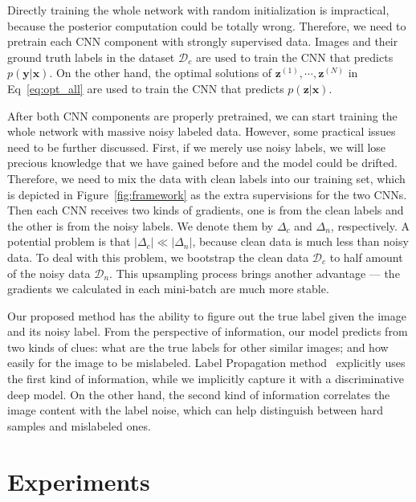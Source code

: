 \documentclass[10pt,twocolumn,letterpaper]{article}
\def\vec{\mathbf}
\begin{document}
Directly training the whole network with random initialization is impractical, because the posterior computation could be totally wrong. Therefore, we need to pretrain each CNN component with strongly supervised data. Images and their ground truth labels in the dataset $\mathcal{D}_c$ are used to train the CNN that predicts $p(\vec{y}|\vec{x})$. On the other hand, the optimal solutions of $\vec{z}^{(1)},\cdots,\vec{z}^{(N)}$ in Eq~\eqref{eq:opt_all} are used to train the CNN that predicts $p(\vec{z}|\vec{x})$.

After both CNN components are properly pretrained, we can start training the whole network with massive noisy labeled data. However, some practical issues need to be further discussed. First, if we merely use noisy labels, we will lose precious knowledge that we have gained before and the model could be drifted. Therefore, we need to mix the data with clean labels into our training set, which is depicted in Figure~\ref{fig:framework} as the extra supervisions for the two CNNs. Then each CNN receives two kinds of gradients, one is from the clean labels and the other is from the noisy labels. We denote them by $\Delta_c$ and $\Delta_n$, respectively. A potential problem is that $|\Delta_c| \ll |\Delta_n|$, because clean data is much less than noisy data. To deal with this problem, we bootstrap the clean data $\mathcal{D}_c$ to half amount of the noisy data $\mathcal{D}_n$. This upsampling process brings another advantage --- the gradients we calculated in each mini-batch are much more stable.

Our proposed method has the ability to figure out the true label given the image and its noisy label. From the perspective of information, our model predicts from two kinds of clues: what are the true labels for other similar images; and how easily for the image to be mislabeled. Label Propagation method~\cite{zhu2002learning} explicitly uses the first kind of information, while we implicitly capture it with a discriminative deep model. On the other hand, the second kind of information correlates the image content with the label noise, which can help distinguish between hard samples and mislabeled ones.

\section{Experiments} %
\label{sec:experiments}
\end{document}
